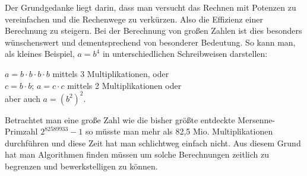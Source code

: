 \documentclass[12pt,a4paper]{article}
\theoremstyle{definition}
\begin{document}
Der Grundgedanke liegt darin, dass man versucht das Rechnen mit Potenzen zu vereinfachen und die Rechenwege zu verkürzen.
Also die Effizienz einer Berechnung zu steigern.
Bei der Berechnung von großen Zahlen ist dies besonders wünschenswert und dementsprechend von besonderer Bedeutung.
So kann man, als kleines Beispiel, $a = b^4$ in unterschiedlichen Schreibweisen darstellen:
\begin{center}
$a = b \cdot b \cdot b \cdot b$ mittels 3 Multiplikationen, oder \\
$c = b \cdot b$; $a = c \cdot c$ mittels 2 Multiplikationen oder \\
aber auch $a = (b^2)^2$.
\end{center}

Betrachtet man eine große Zahl wie die bisher größte entdeckte Mersenne-Primzahl $2^{82589933} - 1$ so müsste man mehr als 82,5 Mio. Multiplikationen durchführen und diese Zeit hat man schlichtweg einfach nicht.
Aus diesem Grund hat man Algorithmen finden müssen um solche Berechnungen zeitlich zu begrenzen und bewerkstelligen zu können.
\end{document}
